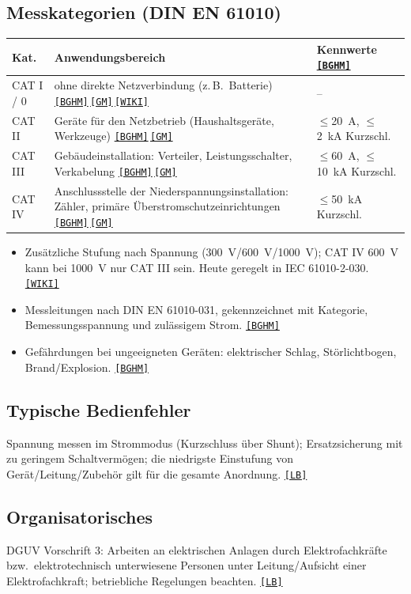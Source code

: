 \documentclass[11pt,a4paper]{article}
\newcommand{\q}[1]{\hyperlink{src:#1}{\textcolor{quelle}{\texttt{\footnotesize[#1]}}}}
\begin{document}
\subsection{Messkategorien (DIN EN 61010)}
\begin{tabularx}{\textwidth}{@{}lXl@{}}
\toprule
Kat. & Anwendungsbereich & Kennwerte \q{BGHM}\\ \midrule
CAT I / 0 & ohne direkte Netzverbindung (z.\,B.\ Batterie) \q{BGHM}\,\q{GM}\,\q{WIKI} & --\\
CAT II & Geräte für den Netzbetrieb (Haushaltsgeräte, Werkzeuge) \q{BGHM}\,\q{GM} & $\leq$\SI{20}{\ampere}, $\leq$\SI{2}{\kilo\ampere} Kurzschl.\\
CAT III & Gebäudeinstallation: Verteiler, Leistungsschalter, Verkabelung \q{BGHM}\,\q{GM} & $\leq$\SI{60}{\ampere}, $\leq$\SI{10}{\kilo\ampere} Kurzschl.\\
CAT IV & Anschlussstelle der Niederspannungsinstallation: Zähler, primäre Überstromschutzeinrichtungen \q{BGHM}\,\q{GM} & $\leq$\SI{50}{\kilo\ampere} Kurzschl.\\
\bottomrule
\end{tabularx}
\begin{itemize}
  \item Zusätzliche Stufung nach Spannung (\SI{300}{\volt}/\SI{600}{\volt}/\SI{1000}{\volt}); CAT IV \SI{600}{\volt} kann bei \SI{1000}{\volt} nur CAT III sein. Heute geregelt in IEC 61010-2-030. \q{WIKI}
  \item Messleitungen nach DIN EN 61010-031, gekennzeichnet mit Kategorie, Bemessungsspannung und zulässigem Strom. \q{BGHM}
  \item Gefährdungen bei ungeeigneten Geräten: elektrischer Schlag, Störlichtbogen, Brand/Explosion. \q{BGHM}
\end{itemize}

\subsection{Typische Bedienfehler}
Spannung messen im Strommodus (Kurzschluss über Shunt); Ersatzsicherung mit zu geringem Schaltvermögen; die niedrigste Einstufung von Gerät/Leitung/Zubehör gilt für die gesamte Anordnung. \q{LB}

\subsection{Organisatorisches}
DGUV Vorschrift 3: Arbeiten an elektrischen Anlagen durch Elektrofachkräfte bzw.\ elektrotechnisch unterwiesene Personen unter Leitung/Aufsicht einer Elektrofachkraft; betriebliche Regelungen beachten. \q{LB}
\end{document}
